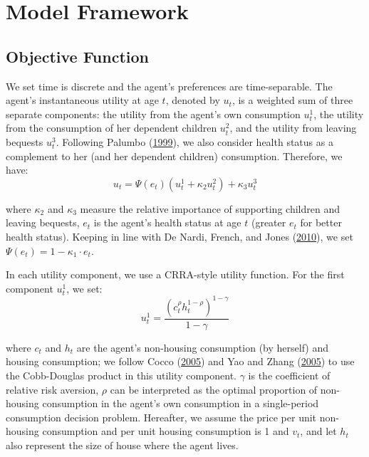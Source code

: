 \documentclass[
  12pt,
]{article}
\begin{document}
\hypertarget{model-framework}{%
\section{Model Framework}\label{model-framework}}

\hypertarget{objective-function}{%
\subsection{Objective Function}\label{objective-function}}

We set time is discrete and the agent's preferences are time-separable.
The agent's instantaneous utility at age \(t\), denoted by \(u_t\), is a
weighted sum of three separate components: the utility from the agent's
own consumption \(u^1_t\), the utility from the consumption of her
dependent children \(u^2_t\), and the utility from leaving bequests
\(u^3_t\). Following Palumbo
(\protect\hyperlink{ref-palumbo_uncertain_1999}{1999}), we also consider
health status as a complement to her (and her dependent children)
consumption. Therefore, we have:\begin{equation}
u_t = \Psi(e_t)(u^1_t + \kappa_2 u^2_t) + \kappa_3 u^3_t
\end{equation}

where \(\kappa_2\) and \(\kappa_3\) measure the relative importance of
supporting children and leaving bequests, \(e_t\) is the agent's health
status at age \(t\) (greater \(e_t\) for better health status). Keeping
in line with De Nardi, French, and Jones
(\protect\hyperlink{ref-de_nardi_why_2010}{2010}), we set
\(\Psi(e_t)=1- \kappa_1 \cdot e_t\).

In each utility component, we use a CRRA-style utility function. For the
first component \(u^1_t\), we set: \begin{equation}
u^1_t = \frac{(c_t^\rho h_t^{1-\rho})^{1-\gamma}}{1-\gamma}
\end{equation}

where \(c_t\) and \(h_t\) are the agent's non-housing consumption (by
herself) and housing consumption; we follow Cocco
(\protect\hyperlink{ref-cocco_portfolio_2005}{2005}) and Yao and Zhang
(\protect\hyperlink{ref-yao_optimal_2005}{2005}) to use the Cobb-Douglas
product in this utility component. \(\gamma\) is the coefficient of
relative risk aversion, \(\rho\) can be interpreted as the optimal
proportion of non-housing consumption in the agent's own consumption in
a single-period consumption decision problem. Hereafter, we assume the
price per unit non-housing consumption and per unit housing consumption
is 1 and \(v_t\), and let \(h_t\) also represent the size of house where
the agent lives.
\end{document}
